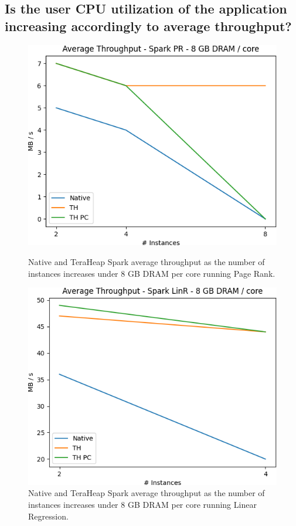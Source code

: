 \subsection{Is the user CPU utilization of the application increasing
accordingly to average throughput?}
\begin{figure}[thbp]
	\centering
        \includegraphics[width=\linewidth]{./fig/PR_64_THR.png}
    \caption{Native and TeraHeap Spark average throughput
	as the number of instances increases under 8 GB DRAM per core running Page Rank.}
\label{fig:pr_64_thr}
        \includegraphics[width=\linewidth]{./fig/LINR_64_THR.png}
    \caption{Native and TeraHeap Spark average throughput
        as the number of instances increases under 8 GB DRAM per core running Linear Regression.}
                \label{fig:linr_64_thr}
\end{figure}

